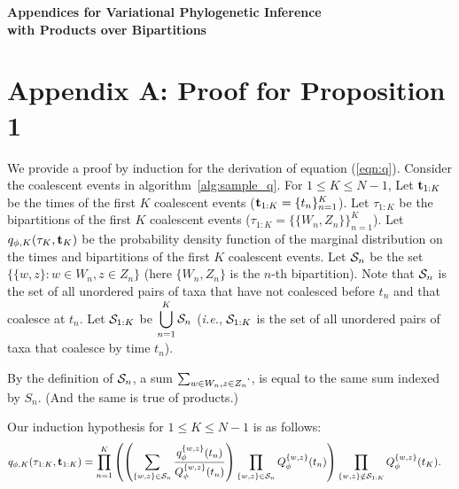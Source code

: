 
\begin{doublespace}
\begin{center}
{\vspace*{0.5em}\LARGE \bf Appendices for Variational Phylogenetic Inference\\with Products over Bipartitions}
\end{center}

\section*{Appendix A: Proof for Proposition 1}\label{app:a}

We provide a proof by induction for the derivation of equation (\ref{eqn:q}). Consider the coalescent events in algorithm~\ref{alg:sample_q}. For $1 \le K \le N - 1$, Let $\mathbf{t}_{1:K}$ be the times of the first $K$ coalescent events ($\mathbf{t}_{1:K}=\{t_n\}_{n=1}^K$).  Let $\tau_{1:K}$ be the bipartitions of the first $K$ coalescent events ($\tau_{1:K} = \{ \{W_n,Z_n\}\}_{n=1}^K$). Let $q_{\phi,K}(\tau_K, \mathbf{t}_K)$ be the probability density function of the marginal distribution on the times and bipartitions of the first $K$ coalescent events. Let $\mathcal{S}_n$ be the set $\{\{w,z\} : w \in W_n, z \in Z_n\}$ (here $\{W_n,Z_n\}$ is the $n$-th bipartition). Note that $\mathcal{S}_n$ is the set of all unordered pairs of taxa that have not coalesced before $t_n$ and that coalesce at  $t_n$. Let $\mathcal{S}_{1:K}$ be $\displaystyle\bigcup_{n=1}^K \mathcal{S}_n$ (\emph{i.e.}, $\mathcal{S}_{1:K}$ is the set of all unordered pairs of taxa that coalesce by time $t_n$).

By the definition of $\mathcal{S}_n$, a sum $\sum_{{w \in W_n, z \in Z_n}} \hspace{-0.25em}\cdot$, is equal to the same sum indexed by $S_n$. (And the same is true of products.)

Our induction hypothesis for $1 \le K \le N - 1$ is as follows:
\begin{align}
    q_{\phi,K}(\tau_{1:K},\mathbf{t}_{1:K}) &= \prod_{n=1}^{K}\left(\left(\sum_{\{w,z\} \in \mathcal{S}_n} \frac{q_\phi^{\{w,z\}}(t_n)}{Q_\phi^{\{w,z\}}(t_n)}\right)
    \prod_{\{w,z\} \in \mathcal{S}_n} Q_\phi^{\{w,z\}}(t_n)\right)
    \prod_{\{w,z\} \notin \mathcal{S}_{1:K}} Q_\phi^{\{w,z\}}(t_K).
    \label{eqn:q_N}
\end{align}
    

\end{doublespace}
